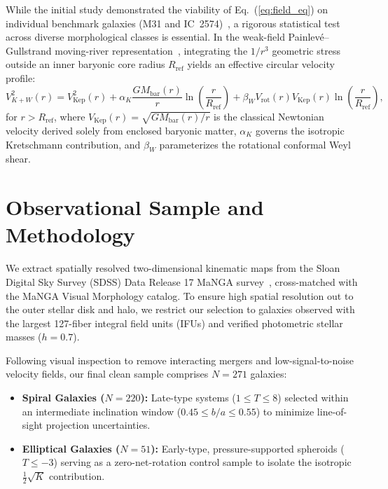 \documentclass[11pt,a4paper]{article}
\begin{document}
While the initial study demonstrated the viability of Eq.~(\ref{eq:field_eq}) on individual benchmark galaxies (M31 and IC~2574)~\cite{Takacs2026,Rubin1980}, a rigorous statistical test across diverse morphological classes is essential. In the weak-field Painlev\'e--Gullstrand moving-river representation~\cite{Hamilton2008}, integrating the $1/r^3$ geometric stress outside an inner baryonic core radius $R_{\mathrm{ref}}$ yields an effective circular velocity profile:
\begin{equation}
V_{K+W}^2(r) = V_{\mathrm{Kep}}^2(r) + \alpha_K \frac{G M_{\mathrm{bar}}(r)}{r} \ln\!\left(\frac{r}{R_{\mathrm{ref}}}\right) + \beta_W V_{\mathrm{rot}}(r) V_{\mathrm{Kep}}(r) \ln\!\left(\frac{r}{R_{\mathrm{ref}}}\right),
\label{eq:vel_profile}
\end{equation}
for $r > R_{\mathrm{ref}}$, where $V_{\mathrm{Kep}}(r) = \sqrt{G M_{\mathrm{bar}}(r)/r}$ is the classical Newtonian velocity derived solely from enclosed baryonic matter, $\alpha_K$ governs the isotropic Kretschmann contribution, and $\beta_W$ parameterizes the rotational conformal Weyl shear.

\section{Observational Sample and Methodology}

We extract spatially resolved two-dimensional kinematic maps from the Sloan Digital Sky Survey (SDSS) Data Release 17 MaNGA survey~\cite{Bundy2015}, cross-matched with the MaNGA Visual Morphology catalog. To ensure high spatial resolution out to the outer stellar disk and halo, we restrict our selection to galaxies observed with the largest 127-fiber integral field units (IFUs) and verified photometric stellar masses ($h = 0.7$).

Following visual inspection to remove interacting mergers and low-signal-to-noise velocity fields, our final clean sample comprises $N = 271$ galaxies:
\begin{itemize}
	\item \textbf{Spiral Galaxies ($N = 220$):} Late-type systems ($1 \le T \le 8$) selected within an intermediate inclination window ($0.45 \le b/a \le 0.55$) to minimize line-of-sight projection uncertainties.
	\item \textbf{Elliptical Galaxies ($N = 51$):} Early-type, pressure-supported spheroids ($T \le -3$) serving as a zero-net-rotation control sample to isolate the isotropic $\frac{1}{2}\sqrt{K}$ contribution.
\end{itemize}
\end{document}
